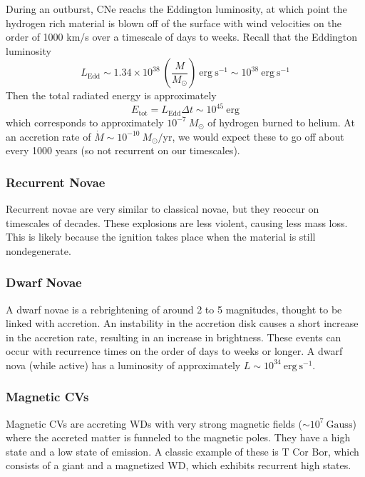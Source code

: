 \documentclass[10pt]{article}
\numberwithin{equation}{section}
\newcommand{\n}{\noindent}
\begin{document}
	\n During an outburst, CNe reachs the Eddington luminosity, at which point the hydrogen rich material is blown off of the surface with wind velocities on the order of 1000 km/s over a timescale of days to weeks. Recall that the Eddington luminosity
	\begin{equation}
		\label{eq:cv:1} L_{\mathrm{Edd}} \sim 1.34\times 10^{38}\ \left(\frac{M}{M_\odot}\right)\ \mathrm{erg\ s^{-1}} \sim 10^{38}\ \mathrm{erg\ s^{-1}}
	\end{equation}
	Then the total radiated energy is approximately
	\begin{equation}
		\label{eq:cv:2} E_{\mathrm{tot}} = L_{\mathrm{Edd}}\Delta t \sim 10^{45}\ \mathrm{erg}
	\end{equation}
	which corresponds to approximately $10^{-7}\ M_\odot$ of hydrogen burned to helium. At an accretion rate of $\dot{M}\sim 10^{-10}\ M_\odot/\mathrm{yr}$, we would expect these to go off about every 1000 years (so not recurrent on our timescales).\\
	
	\subsubsection{Recurrent Novae} %
	\label{ssub:recurrent_novae}
		Recurrent novae are very similar to classical novae, but they reoccur on timescales of decades. These explosions are less violent, causing less mass loss. This is likely because the ignition takes place when the material is still nondegenerate.
	\subsubsection{Dwarf Novae} %
	\label{ssub:dwarf_novae}
	A dwarf novae is a rebrightening of around 2 to 5 magnitudes, thought to be linked with accretion. An instability in the accretion disk causes a short increase in the accretion rate, resulting in an increase in brightness. These events can occur with recurrence times on the order of days to weeks or longer. A dwarf nova (while active) has a luminosity of approximately $L\sim 10^{34}\ \mathrm{erg\ s^{-1}}$.\\
	
	\subsubsection{Magnetic CVs} %
	\label{ssub:magnetic_cvs}
	Magnetic CVs are accreting WDs with very strong magnetic fields ($\sim 10^7\ \mathrm{Gauss}$) where the accreted matter is funneled to the magnetic poles. They have a high state and a low state of emission. A classic example of these is T Cor Bor, which consists of a giant and a magnetized WD, which exhibits recurrent high states.
\end{document}
